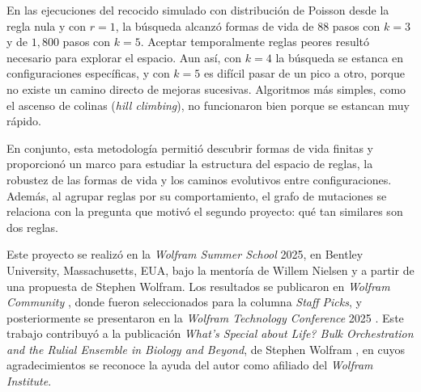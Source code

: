 En las ejecuciones del recocido simulado con distribución de Poisson desde la regla nula y con $r = 1$, la búsqueda alcanzó formas de vida de 88 pasos con $k = 3$ y de $1{,}800$ pasos con $k = 5$. Aceptar temporalmente reglas peores resultó necesario para explorar el espacio. Aun así, con $k = 4$ la búsqueda se estanca en configuraciones específicas, y con $k = 5$ es difícil pasar de un pico a otro, porque no existe un camino directo de mejoras sucesivas. Algoritmos más simples, como el ascenso de colinas (\textit{hill climbing}), no funcionaron bien porque se estancan muy rápido.

En conjunto, esta metodología permitió descubrir formas de vida finitas y proporcionó un marco para estudiar la estructura del espacio de reglas, la robustez de las formas de vida y los caminos evolutivos entre configuraciones. Además, al agrupar reglas por su comportamiento, el grafo de mutaciones se relaciona con la pregunta que motivó el segundo proyecto: qué tan similares son dos reglas.

Este proyecto se realizó en la \textit{Wolfram Summer School} 2025, en Bentley University, Massachusetts, EUA, bajo la mentoría de Willem Nielsen y a partir de una propuesta de Stephen Wolfram. Los resultados se publicaron en \textit{Wolfram Community} \cite{angeles2025adaptive}, donde fueron seleccionados para la columna \textit{Staff Picks}, y posteriormente se presentaron en la \textit{Wolfram Technology Conference} 2025 \cite{angeles2025wtc}. Este trabajo contribuyó a la publicación \textit{What's Special about Life? Bulk Orchestration and the Rulial Ensemble in Biology and Beyond}, de Stephen Wolfram \cite{wolfram2025life}, en cuyos agradecimientos se reconoce la ayuda del autor como afiliado del \textit{Wolfram Institute}.
